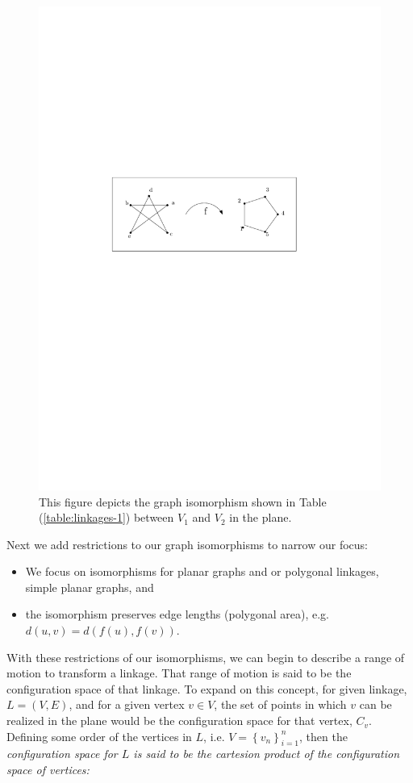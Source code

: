 \begin{figure}[!h]
\begin{center}
\includegraphics[scale=1]{graphics/graphIsomorphismExample.pdf}
\end{center} 
\caption{This figure depicts the graph isomorphism shown in Table 
(\ref{table:linkages-1}) between 
$V_1$ and $V_2$ in the plane.}
\label{fig:configuration-3}
\end{figure}
Next we add restrictions to our graph isomorphisms to narrow our focus:
\begin{itemize}
\item[\rn{1}] We focus on isomorphisms for planar graphs and or polygonal linkages, simple planar 
graphs, and
\item[\rn{2}] the isomorphism preserves edge lengths (polygonal area), e.g. $d(u,v) = d(f(u),f(v))$.
\end{itemize}  
With these restrictions of our isomorphisms, we can begin to describe a range of motion to 
transform a linkage.  That range of motion is said to be the configuration space of that linkage.  
To expand on this concept, for given linkage, $L=(V,E)$, and for a given vertex $v \in V$, the set 
of points in which $v$ can be realized in the plane would be the configuration space for that 
vertex, $C_v$.  Defining some order of the vertices in $L$, i.e. $V = \left\lbrace v_n 
\right\rbrace_{i=1}^n$, then the \it{configuration space} for $L$ is said to be the cartesion 
product of the configuration space of vertices:
